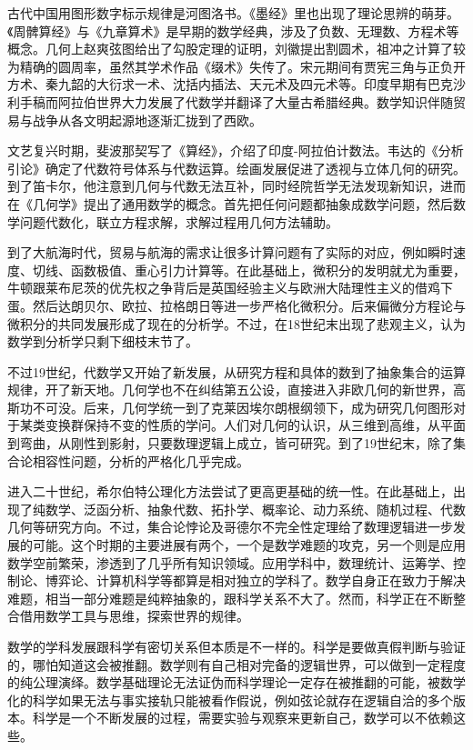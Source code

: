 \documentclass[]{tufte-book}
\begin{document}
古代中国用图形数字标示规律是河图洛书。《墨经》里也出现了理论思辨的萌芽。《周髀算经》与《九章算术》是早期的数学经典，涉及了负数、无理数、方程术等概念。几何上赵爽弦图给出了勾股定理的证明，刘徽提出割圆术，祖冲之计算了较为精确的圆周率，虽然其学术作品《缀术》失传了。宋元期间有贾宪三角与正负开方术、秦九韶的大衍求一术、沈括内插法、天元术及四元术等。印度早期有巴克沙利手稿而阿拉伯世界大力发展了代数学并翻译了大量古希腊经典。数学知识伴随贸易与战争从各文明起源地逐渐汇拢到了西欧。

文艺复兴时期，斐波那契写了《算经》，介绍了印度-阿拉伯计数法。韦达的《分析引论》确定了代数符号体系与代数运算。绘画发展促进了透视与立体几何的研究。到了笛卡尔，他注意到几何与代数无法互补，同时经院哲学无法发现新知识，进而在《几何学》提出了通用数学的概念。首先把任何问题都抽象成数学问题，然后数学问题代数化，联立方程求解，求解过程用几何方法辅助。

到了大航海时代，贸易与航海的需求让很多计算问题有了实际的对应，例如瞬时速度、切线、函数极值、重心引力计算等。在此基础上，微积分的发明就尤为重要，牛顿跟莱布尼茨的优先权之争背后是英国经验主义与欧洲大陆理性主义的借鸡下蛋。然后达朗贝尔、欧拉、拉格朗日等进一步严格化微积分。后来偏微分方程论与微积分的共同发展形成了现在的分析学。不过，在18世纪末出现了悲观主义，认为数学到分析学只剩下细枝末节了。

不过19世纪，代数学又开始了新发展，从研究方程和具体的数到了抽象集合的运算规律，开了新天地。几何学也不在纠结第五公设，直接进入非欧几何的新世界，高斯功不可没。后来，几何学统一到了克莱因埃尔朗根纲领下，成为研究几何图形对于某类变换群保持不变的性质的学问。人们对几何的认识，从三维到高维，从平面到弯曲，从刚性到影射，只要数理逻辑上成立，皆可研究。到了19世纪末，除了集合论相容性问题，分析的严格化几乎完成。

进入二十世纪，希尔伯特公理化方法尝试了更高更基础的统一性。在此基础上，出现了纯数学、泛函分析、抽象代数、拓扑学、概率论、动力系统、随机过程、代数几何等研究方向。不过，集合论悖论及哥德尔不完全性定理给了数理逻辑进一步发展的可能。这个时期的主要进展有两个，一个是数学难题的攻克，另一个则是应用数学空前繁荣，渗透到了几乎所有知识领域。应用学科中，数理统计、运筹学、控制论、博弈论、计算机科学等都算是相对独立的学科了。数学自身正在致力于解决难题，相当一部分难题是纯粹抽象的，跟科学关系不大了。然而，科学正在不断整合借用数学工具与思维，探索世界的规律。

数学的学科发展跟科学有密切关系但本质是不一样的。科学是要做真假判断与验证的，哪怕知道这会被推翻。数学则有自己相对完备的逻辑世界，可以做到一定程度的纯公理演绎。数学基础理论无法证伪而科学理论一定存在被推翻的可能，被数学化的科学如果无法与事实接轨只能被看作假说，例如弦论就存在逻辑自洽的多个版本。科学是一个不断发展的过程，需要实验与观察来更新自己，数学可以不依赖这些。
\end{document}
